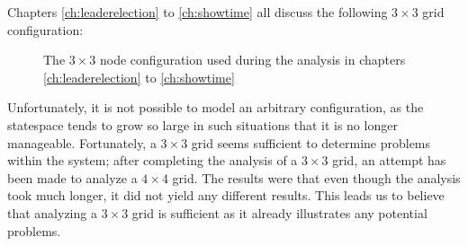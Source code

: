 Chapters \ref{ch:leaderelection} to \ref{ch:showtime} all discuss the following $3 \times 3$ grid configuration:

\begin{figure}[h]
\centering
\begin{nodefigure}
\end{nodefigure}
\caption{\label{fig:configused} The $3 \times 3$ node configuration used during the analysis in chapters \ref{ch:leaderelection} to \ref{ch:showtime}}
\end{figure}

Unfortunately, it is not possible to model an arbitrary configuration, as the statespace tends to grow so large in such situations that it is no longer manageable. Fortunately, a $3 \times 3$ grid seems sufficient to determine problems within the system; after completing the analysis of a $3 \times 3$ grid, an attempt has been made to analyze a $4 \times 4$ grid. The results were that even though the analysis took much longer, it did not yield any different results. This leads us to believe that analyzing a $3 \times 3$ grid is sufficient as it already illustrates any potential problems.
